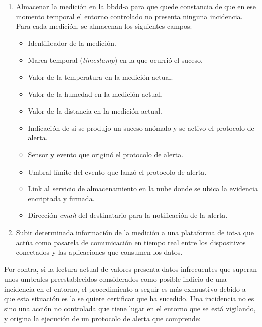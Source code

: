 \documentclass[12pt,a4paper, twoside]{report}
\begin{document}
	\begin{enumerate}
		\item Almacenar la medición en la \gls{bbdd-a} para que quede constancia de que en ese momento temporal el entorno controlado no presenta ninguna incidencia. Para cada medición, se almacenan los siguientes campos:
		
			\begin{itemize}
				\item Identificador de la medición.
				\item Marca temporal (\textit{timestamp}) en la que ocurrió el suceso.
				\item Valor de la temperatura en la medición actual.
				\item Valor de la humedad en la medición actual.
				\item Valor de la distancia en la medición actual.
				\item Indicación de si se produjo un suceso anómalo y se activo el protocolo de alerta.
				\item Sensor y evento que originó el protocolo de alerta.
				\item Umbral límite del evento que lanzó el protocolo de alerta.
				\item Link al servicio de almacenamiento en la nube donde se ubica la evidencia encriptada y firmada.
				\item Dirección \textit{email} del destinatario para la notificación de la alerta.
			\end{itemize}
				
		\item Subir determinada información de la medición a una plataforma de \gls{iot-a} que actúa como pasarela de comunicación en tiempo real entre los dispositivos conectados y las aplicaciones que consumen los datos.		
	\end{enumerate}
	
	Por contra, si la lectura actual de valores presenta datos infrecuentes que superan unos umbrales preestablecidos considerados como posible indicio de una incidencia en el entorno, el procedimiento a seguir es más exhaustivo debido a que esta situación es la se quiere certificar que ha sucedido. Una incidencia no es sino una acción no controlada que tiene lugar en el entorno que se está vigilando, y origina la ejecución de un protocolo de alerta que comprende:
	
\end{document}
